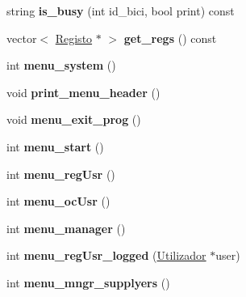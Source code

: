\begin{DoxyCompactItemize}
\item 
\hypertarget{class_rede_aba033af0c2cd9a4f70ca1f9459a6a3ee}{string {\bfseries is\+\_\+busy} (int id\+\_\+bici, bool print) const }\label{class_rede_aba033af0c2cd9a4f70ca1f9459a6a3ee}

\item 
\hypertarget{class_rede_a0862364a4ce27c157b2b756184526748}{vector$<$ \hyperlink{class_registo}{Registo} $\ast$ $>$ {\bfseries get\+\_\+regs} () const }\label{class_rede_a0862364a4ce27c157b2b756184526748}

\item 
\hypertarget{class_rede_a906023ec85b2043b4610e627951e93b8}{int {\bfseries menu\+\_\+system} ()}\label{class_rede_a906023ec85b2043b4610e627951e93b8}

\item 
\hypertarget{class_rede_a7f6b41951357f14d8be5c0c23f59bca9}{void {\bfseries print\+\_\+menu\+\_\+header} ()}\label{class_rede_a7f6b41951357f14d8be5c0c23f59bca9}

\item 
\hypertarget{class_rede_ab94437bdbb3cb32b8489591748c1a57e}{void {\bfseries menu\+\_\+exit\+\_\+prog} ()}\label{class_rede_ab94437bdbb3cb32b8489591748c1a57e}

\item 
\hypertarget{class_rede_ad5f01d997329c28cc736b42e9962c2b6}{int {\bfseries menu\+\_\+start} ()}\label{class_rede_ad5f01d997329c28cc736b42e9962c2b6}

\item 
\hypertarget{class_rede_aa36d94723cae863269eb20375c4491c4}{int {\bfseries menu\+\_\+reg\+Usr} ()}\label{class_rede_aa36d94723cae863269eb20375c4491c4}

\item 
\hypertarget{class_rede_a8865f7a80236b7a399e948a486c86bac}{int {\bfseries menu\+\_\+oc\+Usr} ()}\label{class_rede_a8865f7a80236b7a399e948a486c86bac}

\item 
\hypertarget{class_rede_a71b157db8d1ec17c2e5100faeb95e3d2}{int {\bfseries menu\+\_\+manager} ()}\label{class_rede_a71b157db8d1ec17c2e5100faeb95e3d2}

\item 
\hypertarget{class_rede_af5dd3d55b3cb2f252349128787a96e27}{int {\bfseries menu\+\_\+reg\+Usr\+\_\+logged} (\hyperlink{class_utilizador}{Utilizador} $\ast$user)}\label{class_rede_af5dd3d55b3cb2f252349128787a96e27}

\item 
\hypertarget{class_rede_a11e8c9a0d004251882872f9cc3da54da}{int {\bfseries menu\+\_\+mngr\+\_\+supplyers} ()}\label{class_rede_a11e8c9a0d004251882872f9cc3da54da}


\end{DoxyCompactItemize}

